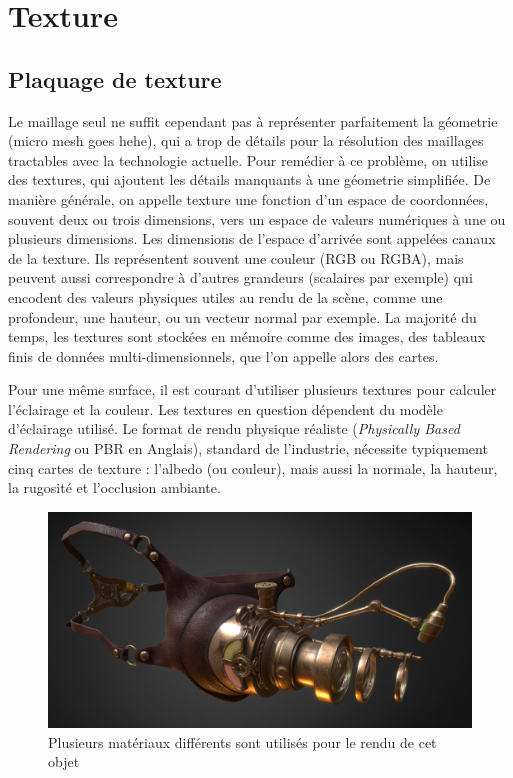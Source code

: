 \section{Texture}

\subsection*{Plaquage de texture}

Le maillage seul ne suffit cependant pas à représenter parfaitement la géometrie (micro mesh goes hehe), qui a trop de détails pour la résolution des maillages tractables avec la technologie actuelle. Pour remédier à ce problème, on utilise des textures, qui ajoutent les détails manquants à une géometrie simplifiée. De manière générale, on appelle texture une fonction d'un espace de coordonnées, souvent deux ou trois dimensions, vers un espace de valeurs numériques à une ou plusieurs dimensions. Les dimensions de l'espace d'arrivée sont appelées canaux de la texture. Ils représentent souvent une couleur (RGB ou RGBA), mais peuvent aussi correspondre à d'autres grandeurs (scalaires par exemple) qui encodent des valeurs physiques utiles au rendu de la scène, comme une profondeur, une hauteur, ou un vecteur normal par exemple. La majorité du temps, les textures sont stockées en mémoire comme des images, des tableaux finis de données multi-dimensionnels, que l'on appelle alors des cartes. 

\bigskip

Pour une même surface, il est courant d'utiliser plusieurs textures pour calculer l'éclairage et la couleur. Les textures en question dépendent du modèle d'éclairage utilisé. Le format de rendu physique réaliste ({\it Physically Based Rendering} ou PBR en Anglais), standard de l'industrie, nécessite typiquement cinq cartes de texture : l'albedo (ou couleur), mais aussi la normale, la hauteur, la rugosité et l'occlusion ambiante.

\bigskip

\begin{figure}
    \centering
    \includegraphics[width=.65\textwidth]{contenu/resources/images/mutli-material-object}
    \caption[Rendu d'un objet comportant plusieurs matériaux]{Plusieurs matériaux différents sont utilisés pour le rendu de cet objet~\cite{multi-material}}
    \label{fig:multi-material}
\end{figure}


